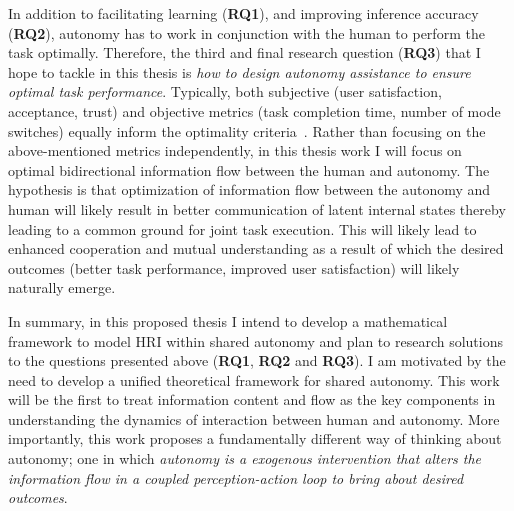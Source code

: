 \documentclass[12pt]{article}
\newcommand{\POINTS}[1]{{\textbf{\color{red}{#1}}}}
\begin{document}
In addition to facilitating learning (\textbf{RQ1}), and improving inference accuracy (\textbf{RQ2}), autonomy has to work in conjunction with the human to perform the task optimally. Therefore, the third and final research question (\textbf{RQ3}) that I hope to tackle in this thesis is \textit{how to design autonomy assistance to ensure optimal task performance}. Typically, both subjective (user satisfaction, acceptance, trust) and objective metrics (task completion time, number of mode switches) equally inform the optimality criteria~\cite{gopinath2017human}. Rather than focusing on the above-mentioned metrics independently, in this thesis work I will focus on optimal bidirectional information flow between the human and autonomy. The hypothesis is that optimization of information flow between the autonomy and human will likely result in better communication of latent internal states thereby leading to a common ground for joint task execution. This will likely lead to enhanced cooperation and mutual understanding as a result of which the desired outcomes (better task performance, improved user satisfaction) will likely naturally emerge.

In summary, in this proposed thesis I intend to develop a mathematical framework to model HRI within shared autonomy and plan to research solutions to the questions presented above (\textbf{RQ1}, \textbf{RQ2} and \textbf{RQ3}). I am motivated by the need to develop a unified theoretical framework for shared autonomy. This work will be the first to treat information content and flow as the key components in understanding the dynamics of interaction between human and autonomy. More importantly, this work proposes a fundamentally different way of thinking about autonomy; one in which \textit{autonomy is a exogenous intervention that alters the information flow in a coupled perception-action loop to bring about desired outcomes}.



%

\end{document}
